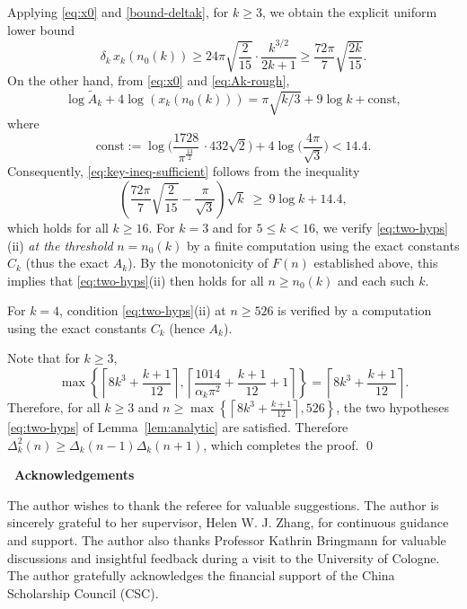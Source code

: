 \documentclass[12pt]{article}
\numberwithin{equation}{section}
\begin{document}
Applying \eqref{eq:x0} and \eqref{bound-deltak}, for $k\ge 3$,
we obtain the explicit uniform lower bound
\begin{equation*}
\delta_k\,x_k\left(n_0(k)\right) \ge 24\pi\sqrt{\frac{2}{15}}\cdot\frac{k^{3/2}}{2k+1}
 \ge\frac{72\pi}{7}\sqrt{\frac{2k}{15}}.
\end{equation*}
On the other hand, from \eqref{eq:x0} and \eqref{eq:Ak-rough},
\[
\log \widetilde{A}_k+4\log \left(x_k\left(n_0(k)\right)\right)
=\pi\sqrt{k/3}+9\log k + \mathrm{const},
\]
where
\[
\mathrm{const}
:=\log\!\Big(\frac{1728}{\pi^{\frac{13}{2}}}\,\cdot 432\sqrt{2}\Big)
+4\log\!\Big(\frac{4\pi}{\sqrt{3}}\Big)
<14.4.
\]
Consequently, \eqref{eq:key-ineq-sufficient} follows from the inequality
\[
\left(\frac{72\pi}{7}\sqrt{\frac{2}{15}}-\frac{\pi}{\sqrt{3}}\right)\sqrt{k}\ \ge\ 9\log k + 14.4,
\]
which holds for all $k\ge 16$.
For $k=3$ and for $5\le k<16$, we verify \eqref{eq:two-hyps}(ii) \emph{at the threshold} $n=n_0(k)$ by a finite computation using the exact constants $C_k$ (thus the exact $A_k$). By the monotonicity of $F(n)$ established above, this implies that \eqref{eq:two-hyps}(ii) then holds for all $n\ge n_0(k)$ and each such $k$.

For $k=4$, condition \eqref{eq:two-hyps}(ii) at
\(n\ge 526\) is verified by a computation
using the exact constants \(C_k\) (hence \(A_k\)).

Note that for $k\ge3$,
\[\max\left\{\left\lceil
8k^{3}+\frac{k+1}{12}\right\rceil,
\left\lceil\frac{1014}{\alpha_k\pi^2}+\frac{k+1}{12}+1
\right\rceil\right\}=\left\lceil
8k^{3}+\frac{k+1}{12}\right\rceil.
\]
Therefore, for all $k\ge3$ and $n\ge \max\left\{\left\lceil
8k^{3}+\frac{k+1}{12}\right\rceil,526\right\}$,
the two hypotheses \eqref{eq:two-hyps} of Lemma~\ref{lem:analytic} are satisfied.
Therefore $\Delta_k^2(n)\ge \Delta_k(n-1)\Delta_k(n+1)$, which completes the proof.
\qed



 \vspace{0.5cm}
 \baselineskip 15pt
{\noindent\bf\large{\ Acknowledgements}} \vspace{7pt} \par
The author wishes to thank the referee for valuable suggestions. The author is sincerely grateful to her supervisor, Helen W. J. Zhang, for continuous guidance and support. The author also thanks Professor Kathrin Bringmann for valuable discussions and insightful feedback during a visit to the University of Cologne. The author gratefully acknowledges the financial support of the China Scholarship Council (CSC).
\end{document}
